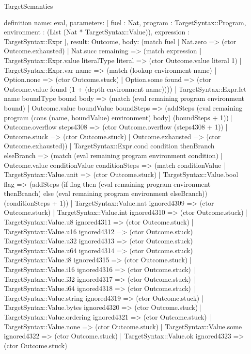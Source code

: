 \begin{lexlean}{TargetSemantics}
\begin{semanticmodule}
definition{
  name: eval,
  parameters: [
    fuel : Nat,
    program : TargetSyntax::Program,
    environment : (List (Nat * TargetSyntax::Value)),
    expression : TargetSyntax::Expr
  ],
  result: Outcome,
  body: (match fuel
    | Nat.zero => (ctor Outcome.exhausted)
    | Nat.succ remaining => (match expression
      | TargetSyntax::Expr.value literalType literal => (ctor Outcome.value literal 1)
      | TargetSyntax::Expr.var name => (match (lookup environment name)
        | Option.none => (ctor Outcome.stuck)
        | Option.some found => (ctor Outcome.value found (1 + (depth environment name))))
      | TargetSyntax::Expr.let name boundType bound body => (match (eval remaining program environment bound)
        | Outcome.value boundValue boundSteps => (addSteps (eval remaining program (cons (name, boundValue) environment) body) (boundSteps + 1))
        | Outcome.overflow steps4308 => (ctor Outcome.overflow (steps4308 + 1))
        | Outcome.stuck => (ctor Outcome.stuck)
        | Outcome.exhausted => (ctor Outcome.exhausted))
      | TargetSyntax::Expr.cond condition thenBranch elseBranch => (match (eval remaining program environment condition)
        | Outcome.value conditionValue conditionSteps => (match conditionValue
          | TargetSyntax::Value.unit => (ctor Outcome.stuck)
          | TargetSyntax::Value.bool flag => (addSteps (if flag then (eval remaining program environment thenBranch) else (eval remaining program environment elseBranch)) (conditionSteps + 1))
          | TargetSyntax::Value.nat ignored4309 => (ctor Outcome.stuck)
          | TargetSyntax::Value.int ignored4310 => (ctor Outcome.stuck)
          | TargetSyntax::Value.u8 ignored4311 => (ctor Outcome.stuck)
          | TargetSyntax::Value.u16 ignored4312 => (ctor Outcome.stuck)
          | TargetSyntax::Value.u32 ignored4313 => (ctor Outcome.stuck)
          | TargetSyntax::Value.u64 ignored4314 => (ctor Outcome.stuck)
          | TargetSyntax::Value.i8 ignored4315 => (ctor Outcome.stuck)
          | TargetSyntax::Value.i16 ignored4316 => (ctor Outcome.stuck)
          | TargetSyntax::Value.i32 ignored4317 => (ctor Outcome.stuck)
          | TargetSyntax::Value.i64 ignored4318 => (ctor Outcome.stuck)
          | TargetSyntax::Value.string ignored4319 => (ctor Outcome.stuck)
          | TargetSyntax::Value.bytes ignored4320 => (ctor Outcome.stuck)
          | TargetSyntax::Value.ordering ignored4321 => (ctor Outcome.stuck)
          | TargetSyntax::Value.none => (ctor Outcome.stuck)
          | TargetSyntax::Value.some ignored4322 => (ctor Outcome.stuck)
          | TargetSyntax::Value.ok ignored4323 => (ctor Outcome.stuck)
}
\end{semanticmodule}
\end{lexlean}
